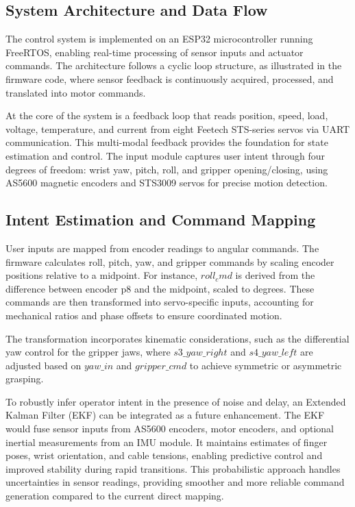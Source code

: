 \subsection{System Architecture and Data Flow}
The control system is implemented on an ESP32 microcontroller running FreeRTOS, enabling real-time processing of sensor inputs and actuator commands. The architecture follows a cyclic loop structure, as illustrated in the firmware code, where sensor feedback is continuously acquired, processed, and translated into motor commands.

At the core of the system is a feedback loop that reads position, speed, load, voltage, temperature, and current from eight Feetech STS-series servos via UART communication. This multi-modal feedback provides the foundation for state estimation and control. The input module captures user intent through four degrees of freedom: wrist yaw, pitch, roll, and gripper opening/closing, using AS5600 magnetic encoders and STS3009 servos for precise motion detection.

\subsection{Intent Estimation and Command Mapping}
User inputs are mapped from encoder readings to angular commands. The firmware calculates roll, pitch, yaw, and gripper commands by scaling encoder positions relative to a midpoint. For instance, $roll_cmd$ is derived from the difference between encoder p8 and the midpoint, scaled to degrees. These commands are then transformed into servo-specific inputs, accounting for mechanical ratios and phase offsets to ensure coordinated motion.

The transformation incorporates kinematic considerations, such as the differential yaw control for the gripper jaws, where $s3\_yaw\_right$ and $s4\_yaw\_left$ are adjusted based on $yaw\_in$ and $gripper\_cmd$ to achieve symmetric or asymmetric grasping.

To robustly infer operator intent in the presence of noise and delay, an Extended Kalman Filter (EKF) can be integrated as a future enhancement. The EKF would fuse sensor inputs from AS5600 encoders, motor encoders, and optional inertial measurements from an IMU module. It maintains estimates of finger poses, wrist orientation, and cable tensions, enabling predictive control and improved stability during rapid transitions. This probabilistic approach handles uncertainties in sensor readings, providing smoother and more reliable command generation compared to the current direct mapping.

